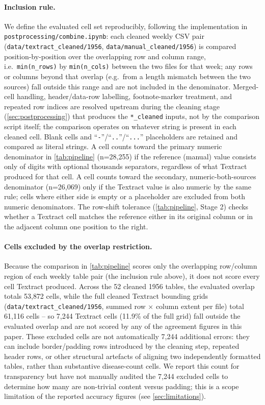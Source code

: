 \documentclass[12pt]{article}
\begin{document}
\paragraph{Inclusion rule.} We define the evaluated cell set reproducibly, following the implementation in \texttt{postprocessing/combine.ipynb}: each cleaned weekly CSV pair (\texttt{data/textract\_cleaned/1956}, \texttt{data/manual\_cleaned/1956}) is compared position-by-position over the overlapping row and column range, i.e.\ \texttt{min(n\_rows)} by \texttt{min(n\_cols)} between the two files for that week; any rows or columns beyond that overlap (e.g.\ from a length mismatch between the two sources) fall outside this range and are not included in the denominator. Merged-cell handling, header/data-row labelling, footnote-marker treatment, and repeated row indices are resolved upstream during the cleaning stage (\cref{sec:postprocessing}) that produces the \texttt{*\_cleaned} inputs, not by the comparison script itself; the comparison operates on whatever string is present in each cleaned cell. Blank cells and ``\texttt{-}''/``\texttt{..}''/``\texttt{...}'' placeholders are retained and compared as literal strings. A cell counts toward the primary numeric denominator in \cref{tab:pipeline} (n=28,255) if the reference (manual) value consists only of digits with optional thousands separators, regardless of what Textract produced for that cell. A cell counts toward the secondary, numeric-both-sources denominator (n=26,069) only if the Textract value is also numeric by the same rule; cells where either side is empty or a placeholder are excluded from both numeric denominators. The row-shift tolerance (\cref{tab:pipeline}, Stage 2) checks whether a Textract cell matches the reference either in its original column or in the adjacent column one position to the right.

\paragraph{Cells excluded by the overlap restriction.} Because the comparison in \cref{tab:pipeline} scores only the overlapping row/column region of each weekly table pair (the inclusion rule above), it does not score every cell Textract produced. Across the 52 cleaned 1956 tables, the evaluated overlap totals 53{,}872 cells, while the full cleaned Textract bounding grids (\texttt{data/textract\_cleaned/1956}, summed row $\times$ column extent per file) total 61{,}116 cells -- so 7{,}244 Textract cells (11.9\% of the full grid) fall outside the evaluated overlap and are not scored by any of the agreement figures in this paper. These excluded cells are not automatically 7{,}244 additional errors: they can include border/padding rows introduced by the cleaning step, repeated header rows, or other structural artefacts of aligning two independently formatted tables, rather than substantive disease-count cells. We report this count for transparency but have not manually audited the 7{,}244 excluded cells to determine how many are non-trivial content versus padding; this is a scope limitation of the reported accuracy figures (see \cref{sec:limitations}).
\end{document}
